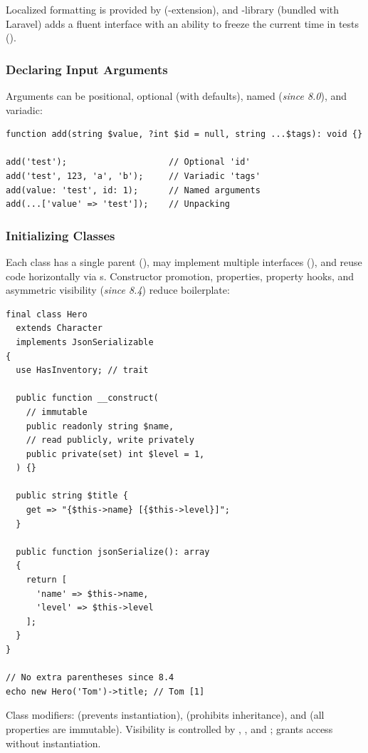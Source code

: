 \noindent Localized formatting is provided by  (-extension), and
-library (bundled with Laravel) adds a fluent interface with an ability to freeze the
current time in tests ().


\subsubsection{Declaring Input Arguments}

Arguments can be positional, optional (with defaults), named (\emph{since 8.0}), and variadic:

\begin{lstlisting}
function add(string $value, ?int $id = null, string ...$tags): void {}

add('test');                    // Optional 'id'
add('test', 123, 'a', 'b');     // Variadic 'tags'
add(value: 'test', id: 1);      // Named arguments
add(...['value' => 'test']);    // Unpacking
\end{lstlisting}


\subsubsection{Initializing Classes}

Each class has a single parent (), may implement multiple interfaces
(), and reuse code horizontally via s. Constructor promotion,
 properties, property hooks, and asymmetric visibility (\emph{since 8.4})
reduce boilerplate:

\newpage
\begin{lstlisting}
final class Hero
  extends Character
  implements JsonSerializable
{
  use HasInventory; // trait

  public function __construct(
    // immutable
    public readonly string $name,
    // read publicly, write privately
    public private(set) int $level = 1,
  ) {}

  public string $title {
    get => "{$this->name} [{$this->level}]";
  }

  public function jsonSerialize(): array
  {
    return [
      'name' => $this->name,
      'level' => $this->level
    ];
  }
}

// No extra parentheses since 8.4
echo new Hero('Tom')->title; // Tom [1]
\end{lstlisting}

\noindent Class modifiers:  (prevents instantiation),  (prohibits
inheritance), and  (all properties are immutable). Visibility is controlled by
, , and ;  grants access without instantiation.


